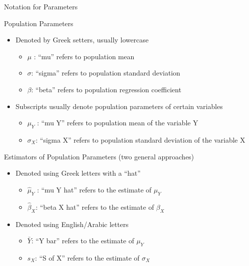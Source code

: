 \documentclass[
  8pt,
  ignorenonframetext,
  dvipsnames]{beamer}
\providecommand{\tightlist}{%
  \setlength{\itemsep}{0pt}\setlength{\parskip}{0pt}}
\let\olditem\item
\renewcommand{\item}{%
  \olditem\vspace{4pt}
}
\begin{document}
\begin{frame}{Notation for Parameters}
\protect\hypertarget{notation-for-parameters}{}

Population Parameters

\begin{itemize}
\tightlist
\item
  Denoted by Greek setters, usually lowercase

  \begin{itemize}
  \tightlist
  \item
    \(\mu\) : ``mu'' refers to population mean
  \item
    \(\sigma\): ``sigma'' refers to population standard deviation
  \item
    \(\beta\): ``beta'' refers to population regression coefficient
  \end{itemize}
\item
  Subscripts usually denote population parameters of certain variables

  \begin{itemize}
  \tightlist
  \item
    \(\mu_Y\) : ``mu Y'' refers to population mean of the variable Y
  \item
    \(\sigma_X\): ``sigma X'' refers to population standard deviation of
    the variable X
  \end{itemize}
\end{itemize}

\medskip

Estimators of Population Parameters (two general approaches)

\begin{itemize}
\tightlist
\item
  Denoted using Greek letters with a ``hat''

  \begin{itemize}
  \tightlist
  \item
    \(\hat{\mu}_Y\) : ``mu Y hat'' refers to the estimate of \(\mu_Y\)
  \item
    \(\hat{\beta}_X\): ``beta X hat'' refers to the estimate of
    \(\beta_X\)
  \end{itemize}
\item
  Denoted using English/Arabic letters

  \begin{itemize}
  \tightlist
  \item
    \(\bar{Y}\): ``Y bar'' refers to the estimate of \(\mu_Y\)
  \item
    \(s_X\): ``S of X'' refers to the estimate of \(\sigma_X\)
  \end{itemize}
\end{itemize}

\end{frame}
\end{document}
